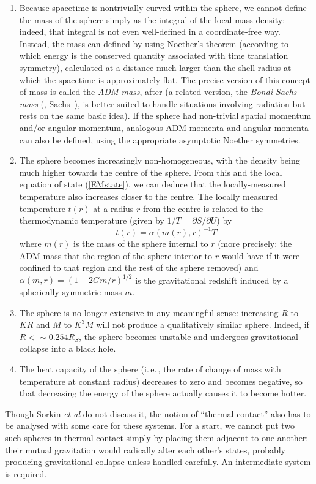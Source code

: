 \documentclass[12pt]{article}
\newcommand{\iec}{\mbox{i.\,e.\,}}
\newcommand{\be}{\begin{equation}}
\newcommand{\ee}{\end{equation}}
\begin{document}
\begin{enumerate}
\item Because spacetime is nontrivially curved within the sphere, we cannot define the mass of the sphere simply as the integral of the local mass-density: indeed, that integral is not even well-defined in a coordinate-free way. Instead, the mass can defined by using Noether's theorem (according to which energy is the conserved quantity associated with time translation symmetry), calculated at a distance much larger than the shell radius at which the spacetime is approximately flat. The precise version of this concept of mass is called the \emph{ADM mass}, after  (a related version, the \emph{Bondi-Sachs mass} (, Sachs~), is better suited to handle situations involving radiation but rests on the same basic idea). If the sphere had non-trivial spatial momentum and/or angular momentum, analogous ADM momenta and angular momenta can also be defined, using the appropriate asymptotic Noether symmetries. 
\item The sphere becomes increasingly non-homogeneous, with the density being much higher towards the centre of the sphere. From this and the local equation of state (\ref{EMstate}), we can deduce that the locally-measured temperature also increases closer to the centre. The locally measured temperature $t(r)$  at a radius $r$ from the centre is related to the thermodynamic temperature (given by $1/T=\partial S/\partial U$) by
\be
t(r) = \alpha(m(r),r)^{-1} T
\ee
where $m(r)$ is the mass of the sphere internal to $r$ (more precisely: the ADM mass that the region of the sphere interior to $r$ would have if it were confined to that region and the rest of the sphere removed) and $\alpha(m,r)=(1-2Gm/r)^{1/2}$ is the gravitational redshift induced by a spherically symmetric mass $m$.
\item The sphere is no longer extensive in any meaningful sense: increasing $R$ to $KR$ and $M$ to $K^3M$ will not produce a qualitatively similar sphere. Indeed, if $R<\sim 0.254 R_S$, the sphere becomes unstable and undergoes gravitational collapse into a black hole.
\item The heat capacity of the sphere (\iec, the rate of change of mass with temperature at constant radius) decreases to zero and becomes negative, so that decreasing the energy of the sphere actually causes it to become hotter.
\end{enumerate}
Though Sorkin \emph{et al} do not discuss it, the notion of ``thermal contact'' also has to be analysed with some care for these systems. For a start, we cannot put two such spheres in thermal contact simply by placing them adjacent to one another: their mutual gravitation would radically alter each other's states, probably producing gravitational collapse unless handled carefully. An intermediate system is required. 
\end{document}
